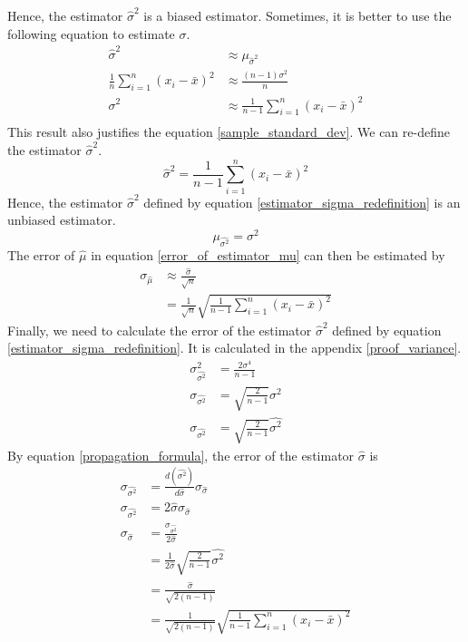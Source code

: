 \documentclass[12pt,a4paper]{report}
\begin{document}
Hence, the estimator $\hat{\sigma}^2$ is a biased estimator. Sometimes, it is better to use the following equation to estimate $\sigma$.
\begin{align*}
\hat{\sigma}^2 &\approx \mu_{\hat{\sigma}^2} \\
\frac{1}{n} \sum_{i = 1}^{n} (x_i - \bar{x})^2 &\approx \frac{(n-1)\sigma^2}{n} \\
\sigma^2 &\approx \frac{1}{n-1} \sum_{i = 1}^{n} (x_i - \bar{x})^2 \\
\end{align*}
This result also justifies the equation \ref{sample_standard_dev}.
We can re-define the estimator $\hat{\sigma}^2$.
\begin{equation} \label{estimator_sigma_redefinition}
\hat{\sigma}^2 = \frac{1}{n-1} \sum_{i = 1}^{n} (x_i - \bar{x})^2
\end{equation}
Hence, the estimator $\hat{\sigma}^2$ defined by equation \ref{estimator_sigma_redefinition} is an unbiased estimator.
\begin{equation*}
\mu_{\hat{\sigma^2}} = \sigma^2
\end{equation*}
The error of $\hat{\mu}$ in equation \ref{error_of_estimator_mu} can then be estimated by
\begin{align*}
\sigma_{\hat{\mu}}
&\approx \frac{\hat{\sigma}}{\sqrt{n}} \\
&= \frac{1}{\sqrt{n}} \sqrt{ \frac{1}{n-1} \sum_{i = 1}^{n} (x_i - \bar{x})^2 }
\end{align*}
Finally, we need to calculate the error of the estimator $\hat{\sigma}^2$ defined by equation \ref{estimator_sigma_redefinition}. It is calculated in the appendix \ref{proof_variance}.
\begin{align*}
\sigma_{\hat{\sigma^2}}^2 &= \frac{2\sigma^4}{n-1} \\
\sigma_{\hat{\sigma^2}} &= \sqrt{\frac{2}{n-1}} \sigma^2 \\
\sigma_{\hat{\sigma^2}} &= \sqrt{\frac{2}{n-1}} \hat{\sigma^2}
\end{align*}
By equation \ref{propagation_formula}, the error of the estimator $\hat{\sigma}$ is
\begin{align*}
\sigma_{\hat{\sigma^2}} &= \frac{d(\hat{\sigma^2})}{d\hat{\sigma}} \sigma_{\hat{\sigma}} \\
\sigma_{\hat{\sigma^2}} &= 2 \hat{\sigma} \sigma_{\hat{\sigma}} \\
\sigma_{\hat{\sigma}} &= \frac{\sigma_{\hat{\sigma^2}}} {2 \hat{\sigma}} \\
&= \frac{1}{2\hat{\sigma}} \sqrt{\frac{2}{n-1}} \hat{\sigma^2} \\
&= \frac{\hat{\sigma}}{\sqrt{2(n-1)}} \\
&= \frac{1}{\sqrt{2(n-1)}} \sqrt{ \frac{1}{n-1} \sum_{i = 1}^{n} (x_i - \bar{x})^2 } \\
\end{align*}
\end{document}
